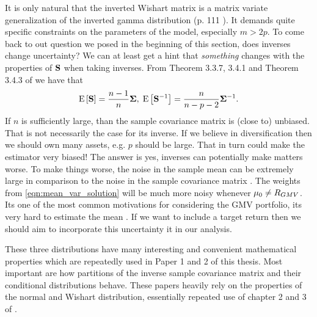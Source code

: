 \documentclass[]{book}\usepackage{knitr}
\begin{document}
It is only natural that the inverted Wishart matrix is a matrix variate generalization of the inverted gamma distribution (p. 111 \citet{GuptaNagar2000}). 
It demands quite specific constraints on the parameters of the model, especially $m > 2p$.
To come back to out question we posed in the beginning of this section, does inverses change uncertainty? 
We can at least get a hint that \textit{something} changes with the properties of $\mathbf{S}$ when taking inverses.
From Theorem 3.3.7, 3.4.1 and Theorem 3.4.3 of \citet{GuptaNagar2000} we have that
$$
\operatorname{E}\left[\mathbf{S}\right] = \frac{n-1}{n} \mathbf{\Sigma}, \; 
\operatorname{E}\left[\mathbf{S}^{-1}\right] = \frac{n}{n-p-2}\mathbf{\Sigma}^{-1}.
$$
If $n$ is sufficiently large, than the sample covariance matrix is (close to) unbiased.
That is not necessarily the case for its inverse.
If we believe in diversification then we should own many assets, e.g. $p$ should be large. 
That in turn could make the estimator very biased!
The answer is yes, inverses can potentially make matters worse.
To make things worse, the noise in the sample mean can be extremely large in comparison to the noise in the sample covariance matrix \cite{REF}.
The weights from \eqref{eqn:mean_var_solution} will be much more noisy whenever $\mu_0 \neq R_{GMV}$. 
Its one of the most common motivations for considering the GMV portfolio, its very hard to estimate the mean \citep{golosnoy2019exponential}.  
If we want to include a target return then we should aim to incorporate this uncertainty it in our analysis.

These three distributions have many interesting and convenient mathematical properties which are repeatedly used in Paper 1 and 2 of this thesis.
Most important are how partitions of the inverse sample covariance matrix and their conditional distributions behave.
These papers heavily rely on the properties of the normal and Wishart distribution, essentially repeated use of chapter 2 and 3 of \citet{GuptaNagar2000}.
\end{document}
